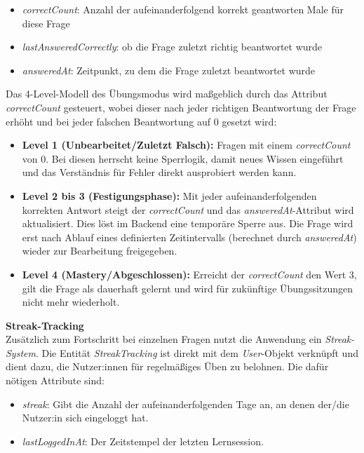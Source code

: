 \begin{itemize}
  \item \textit{correctCount}: Anzahl der aufeinanderfolgend korrekt geantworten Male für diese Frage
  \item \textit{lastAnsweredCorrectly}: ob die Frage zuletzt richtig beantwortet wurde
  \item \textit{answeredAt}: Zeitpunkt, zu dem die Frage zuletzt beantwortet wurde
\end{itemize}


Das 4-Level-Modell des Übungsmodus wird maßgeblich durch das Attribut \textit{correctCount} gesteuert, wobei dieser nach jeder richtigen Beantwortung der Frage erhöht und bei jeder falschen Beantwortung auf 0 gesetzt wird:

\begin{itemize}
	\item \textbf{Level 1 (Unbearbeitet/Zuletzt Falsch):} Fragen mit einem \textit{correctCount} von 0. Bei diesen herrscht keine Sperrlogik, damit neues Wissen eingeführt und das Verständnis für Fehler direkt ausprobiert werden kann.
	\item \textbf{Level 2 bis 3 (Festigungsphase):} Mit jeder aufeinanderfolgenden korrekten Antwort steigt der \textit{correctCount} und das \textit{answeredAt}-Attribut wird aktualisiert. Dies löst im Backend eine temporäre Sperre aus. Die Frage wird erst nach Ablauf eines definierten Zeitintervalls (berechnet durch \textit{answeredAt}) wieder zur Bearbeitung freigegeben.
	\item \textbf{Level 4 (Mastery/Abgeschlossen):} Erreicht der \textit{correctCount} den Wert 3, gilt die Frage als dauerhaft gelernt und wird für zukünftige Übungssitzungen nicht mehr wiederholt.
\end{itemize}

\vspace{0.2cm}
\textbf{Streak-Tracking} \\
Zusätzlich zum Fortschritt bei einzelnen Fragen nutzt die Anwendung ein \textit{Streak-System}. Die Entität \textit{StreakTracking} ist direkt mit dem \textit{User}-Objekt verknüpft und dient dazu, die Nutzer:innen für regelmäßiges Üben zu belohnen. Die dafür nötigen Attribute sind:

\begin{itemize}
	\item \textit{streak}: Gibt die Anzahl der aufeinanderfolgenden Tage an, an denen der/die Nutzer:in sich eingeloggt hat.
	\item \textit{lastLoggedInAt}: Der Zeitstempel der letzten Lernsession.
\end{itemize}

